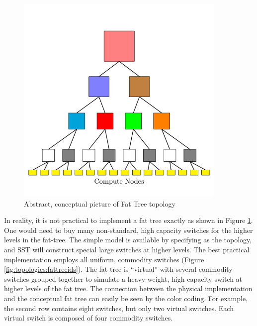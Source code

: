 \begin{figure}[h!]
\centering
\includegraphics[width=0.9\textwidth]{figures/tikz/fattree/abstract_fattree.png}
\caption{Abstract, conceptual picture of Fat Tree topology}
\label{fig:topologies:abstractfattree}
\end{figure}

In reality, it is not practical to implement a fat tree exactly as shown in Figure \ref{fig:topologies:abstractfattree}.
One would need to buy many non-standard, high capacity switches for the higher levels in the fat-tree.
The simple model is available by specifying  as the topology, and SST will construct special large switches at higher levels.
The best practical implementation employs all uniform, commodity switches (Figure \ref{fig:topologies:fattreeids}).
The fat tree is ``virtual'' with several commodity switches grouped together to simulate a heavy-weight, high capacity switch
at higher levels of the fat tree.
The connection between the physical implementation and the conceptual fat tree can easily be seen by the color coding.
For example, the second row contains eight switches, but only two virtual switches.
Each virtual switch is composed of four commodity switches.

